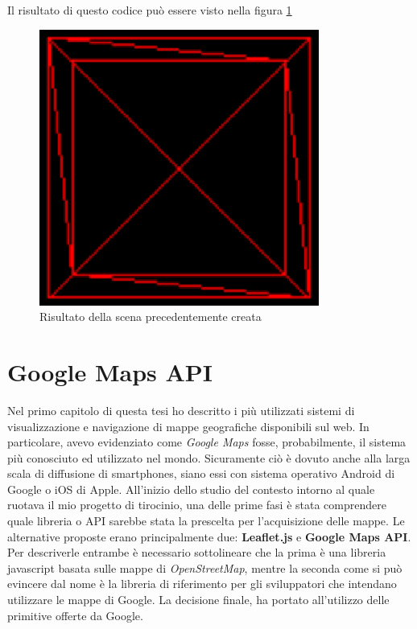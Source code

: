 Il risultato di questo codice può essere visto nella figura \ref{fig:threeexample}
\begin{figure}[H]
	\centering
		\includegraphics[scale=0.5]{figure/threeexample.eps}
	\caption{Risultato della scena precedentemente creata}\label{fig:threeexample}
\end{figure}

\section{Google Maps API}
Nel primo capitolo di questa tesi ho descritto i più utilizzati sistemi di visualizzazione e navigazione di mappe geografiche disponibili sul web. In particolare, avevo evidenziato come \textit{Google Maps} fosse, probabilmente, il sistema più conosciuto ed utilizzato nel mondo. Sicuramente ciò è dovuto anche alla larga scala di diffusione di smartphones, siano essi con sistema operativo Android di Google o iOS di Apple. All'inizio dello studio del contesto intorno al quale ruotava il mio progetto di tirocinio, una delle prime fasi è stata comprendere quale libreria o API sarebbe stata la prescelta per l'acquisizione delle mappe. Le alternative proposte erano principalmente due: \textbf{Leaflet.js} e \textbf{Google Maps API}. Per descriverle entrambe è necessario sottolineare che la prima è una libreria javascript basata sulle mappe di \textit{OpenStreetMap}, mentre la seconda come si può evincere dal nome è la libreria di riferimento per gli sviluppatori che intendano utilizzare le mappe di Google. La decisione finale, ha portato all'utilizzo delle primitive offerte da Google. 

